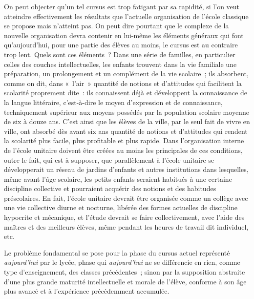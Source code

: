 \documentclass[french,twoside]{book} %
\begin{document}
On peut objecter qu’un tel cursus est trop fatigant par sa rapidité, si l’on veut atteindre effectivement les résultats que l’actuelle organisation de l’école classique se propose mais n’atteint pas. On peut dire pourtant que le complexe de la nouvelle organisation devra contenir en lui-même les éléments généraux qui font qu’aujourd’hui, pour une partie des élèves au moins, le cursus est au contraire trop lent. Quels sont ces éléments ? Dans une série de familles, en particulier celles des couches intellectuelles, les enfants trouvent dans la vie familiale une préparation, un prolongement et un complément de la vie scolaire ; ils absorbent, comme on dit, dans « l’air » quantité de notions et d’attitudes qui facilitent la scolarité proprement dite : ils connaissent déjà et développent la connaissance de la langue littéraire, c’est-à-dire le moyen d’expression et de connaissance, techniquement supérieur aux moyens possédés par la population scolaire moyenne de six à douze ans. C'est ainsi que les élèves de la ville, par le seul fait de vivre en ville, ont absorbé dès avant six ans quantité de notions et d’attitudes qui rendent la scolarité plus facile, plus profitable et plus rapide. Dans l’organisation interne de l’école unitaire doivent être créées au moins les principales de ces conditions, outre le fait, qui est à supposer, que parallèlement à l’école unitaire se développerait un réseau de jardins d’enfants et autres institutions dans lesquelles, même avant l’âge scolaire, les petits enfants seraient habitués à une certaine discipline collective et pourraient acquérir des notions et des habitudes préscolaires. En fait, l’école unitaire devrait être organisée comme un collège avec une vie collective diurne et nocturne, libérée des formes actuelles de discipline hypocrite et mécanique, et l’étude devrait se faire collectivement, avec l’aide des maîtres et des meilleurs élèves, même pendant les heures de travail dit individuel, etc.\par
Le problème fondamental se pose pour la phase du cursus actuel représenté \emph{aujourd’hui} par le lycée, phase qui \emph{aujourd’hui} ne se différencie en rien, comme type d’enseignement, des classes précédentes ; sinon par la supposition abstraite d’une plus grande maturité intellectuelle et morale de l’élève, conforme à son âge plus avancé et à l’expérience précédemment accumulée.\par
\end{document}

